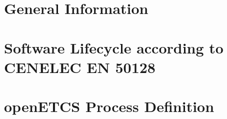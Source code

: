 \documentclass{template/openetcs_article}
\begin{document}

\section{General Information}
\label{sec:general-information}


\section{Software Lifecycle according to CENELEC EN 50128}
\label{sec:sofware-lifecycle}


\section{openETCS Process Definition}
\label{sec:open-proc-defin}


%

\end{document}
